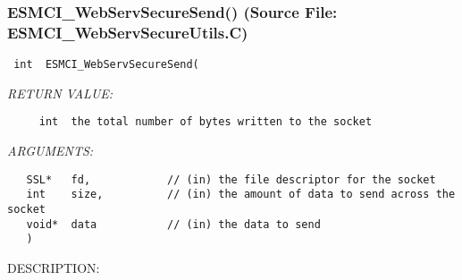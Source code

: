  
\setlength{\oldparskip}{\parskip}
\setlength{\parskip}{1.5ex}
\setlength{\oldparindent}{\parindent}
\setlength{\parindent}{0pt}
\setlength{\oldbaselineskip}{\baselineskip}
\setlength{\baselineskip}{11pt}
 
\def\bv{\begin{verbatim}}
\def\ev{\end{verbatim}}
\def\be{\begin{equation}}
\def\ee{\end{equation}}
\def\bea{\begin{eqnarray}}
\def\eea{\end{eqnarray}}
\def\bi{\begin{itemize}}
\def\ei{\end{itemize}}
\def\bn{\begin{enumerate}}
\def\en{\end{enumerate}}
\def\bd{\begin{description}}
\def\ed{\end{description}}
\def\({\left (}
\def\){\right )}
\def\[{\left [}
\def\]{\right ]}
\def\<{\left  \langle}
\def\>{\right \rangle}
\def\cI{{\cal I}}
\def\diag{\mathop{\rm diag}}
\def\tr{\mathop{\rm tr}}


 
\subsubsection{ESMCI\_WebServSecureSend() (Source File: ESMCI\_WebServSecureUtils.C)}


  
\begin{verbatim} int  ESMCI_WebServSecureSend(\end{verbatim}{\em RETURN VALUE:}
\begin{verbatim}     int  the total number of bytes written to the socket\end{verbatim}{\em ARGUMENTS:}
\begin{verbatim}   SSL*   fd,            // (in) the file descriptor for the socket
   int    size,          // (in) the amount of data to send across the socket
   void*  data           // (in) the data to send
   )\end{verbatim}
{\sf DESCRIPTION:\\ }


